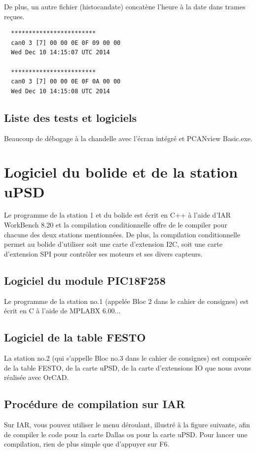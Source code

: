 \documentclass[10pt,a4paper,final]{article}
\begin{document}
De plus, un autre fichier (histocandate) concatène l'heure à la date dans trames reçues.
\begin{verbatim}
  ************************
  can0 3 [7] 00 00 0E 0F 09 00 00
  Wed Dec 10 14:15:07 UTC 2014
 
  ************************
  can0 3 [7] 00 00 0E 0F 0A 00 00
  Wed Dec 10 14:15:08 UTC 2014
\end{verbatim} 
\begin{spacing}{1.5}
\subsection{Liste des tests et logiciels}
Beaucoup de débogage à la chandelle avec l'écran intégré et PCANview Basic.exe.
\vfill
\pagebreak





\section{Logiciel du bolide et de la station uPSD }
Le programme de la station 1 et du bolide est écrit en C++ à l'aide d'IAR WorkBench 8.20 et la compilation conditionnelle offre de le compiler pour chacune des deux stations mentionnées. De plus, la compilation conditionnelle permet au bolide d'utiliser soit une carte d'extension I2C, soit une carte d'extension SPI pour contrôler ses moteurs et ses divers capteurs.

\subsection{Logiciel du module PIC18F258}
Le programme de la station no.1 (appelée Bloc 2 dans le cahier de consignes) est écrit en C à l'aide de MPLABX 6.00...

\subsection{Logiciel de la table FESTO}
La station no.2 (qui s'appelle Bloc no.3 dans le cahier de consignes) est composée de la table FESTO, de la carte uPSD, de la carte d'extensions IO que nous avons réalisée avec OrCAD.


\vfill
\pagebreak

\subsection{Procédure de compilation sur IAR}
Sur IAR, vous pouvez utiliser le menu déroulant, illustré à la figure suivante, afin de compiler le code pour la carte Dallas ou pour la carte uPSD. Pour lancer une compilation, rien de plus simple que d'appuyer sur F6.


\end{spacing}
\end{document}
